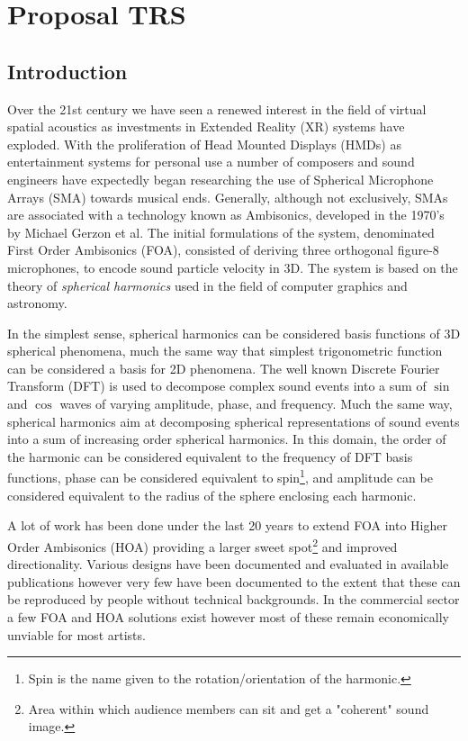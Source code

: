 \chapter{Proposal TRS} \label{ch:prop-trs}


\section{Introduction}
Over the 21st century we have seen a renewed interest in the field of virtual spatial acoustics as investments in Extended Reality (XR) systems have exploded. With the proliferation of Head Mounted Displays (HMDs) as entertainment systems for personal use a number of composers and sound engineers have expectedly began researching the use of Spherical Microphone Arrays (SMA) towards musical ends. 
Generally, although not exclusively, SMAs are associated with a technology known as Ambisonics, developed in the 1970's by Michael Gerzon et al. The initial formulations of the system, denominated First Order Ambisonics (FOA), consisted of deriving three orthogonal figure-8 microphones, to encode sound particle velocity in 3D. The system is based on the theory of \textit{spherical harmonics} used in the field of computer graphics and astronomy. 

In the simplest sense, spherical harmonics can be considered basis functions of 3D spherical phenomena, much the same way that simplest trigonometric function can be considered a basis for 2D phenomena. The well known Discrete Fourier Transform (DFT) is used to decompose complex sound events into a sum of $\sin$ and $\cos$ waves of varying amplitude, phase, and frequency. Much the same way, spherical harmonics aim at decomposing spherical representations of sound events into a sum of increasing order spherical harmonics. In this domain, the order of the harmonic can be considered equivalent to the frequency of DFT basis functions, phase can be considered equivalent to spin\footnote{Spin is the name given to the rotation/orientation of the harmonic.}, and amplitude can be considered equivalent to the radius of the sphere enclosing each harmonic. 

A lot of work has been done under the last 20 years to extend FOA into Higher Order Ambisonics (HOA) providing a larger sweet spot\footnote{Area within which audience members can sit and get a "coherent" sound image.} and improved directionality. Various designs have been documented and evaluated in available publications however very few have been documented to the extent that these can be reproduced by people without technical backgrounds. In the commercial sector a few FOA and HOA solutions exist however most of these remain economically unviable for most artists. 

